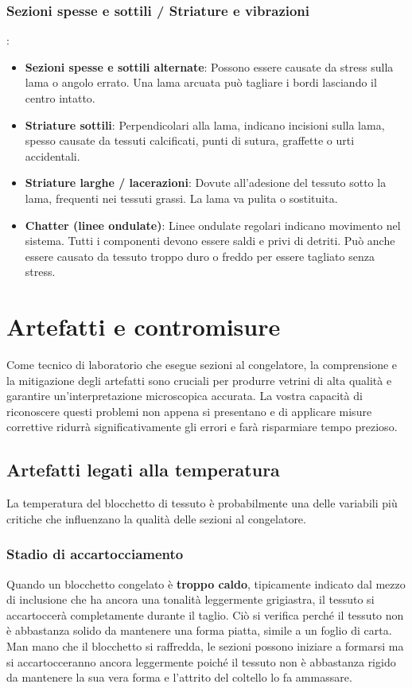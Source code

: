\subsubsection{Sezioni spesse e sottili / Striature e vibrazioni}:
\begin{itemize}
\item \textbf{Sezioni spesse e sottili alternate}: Possono essere causate da stress sulla lama o angolo errato. Una lama arcuata può tagliare i bordi lasciando il centro intatto.
\item \textbf{Striature sottili}: Perpendicolari alla lama, indicano incisioni sulla lama, spesso causate da tessuti calcificati, punti di sutura, graffette o urti accidentali.
\item \textbf{Striature larghe / lacerazioni}: Dovute all'adesione del tessuto sotto la lama, frequenti nei tessuti grassi. La lama va pulita o sostituita.
\item \textbf{Chatter (linee ondulate)}: Linee ondulate regolari indicano movimento nel sistema. Tutti i componenti devono essere saldi e privi di detriti. Può anche essere causato da tessuto troppo duro o freddo per essere tagliato senza stress.
\end{itemize}

\section{Artefatti e contromisure}
\label{sec:artefatti}
Come tecnico di laboratorio che esegue sezioni al congelatore, la comprensione e la mitigazione degli artefatti sono cruciali per produrre vetrini di alta qualità e garantire un'interpretazione microscopica accurata.  La vostra capacità di riconoscere questi problemi non appena si presentano e di applicare misure correttive ridurrà significativamente gli errori e farà risparmiare tempo prezioso. 

\subsection{Artefatti legati alla temperatura}
La temperatura del blocchetto di tessuto è probabilmente una delle variabili più critiche che influenzano la qualità delle sezioni al congelatore. 

\subsubsection{Stadio di accartocciamento}
Quando un blocchetto congelato è \textbf{troppo caldo}, tipicamente indicato dal mezzo di inclusione che ha ancora una tonalità leggermente grigiastra, il tessuto si accartoccerà completamente durante il taglio.  Ciò si verifica perché il tessuto non è abbastanza solido da mantenere una forma piatta, simile a un foglio di carta.  Man mano che il blocchetto si raffredda, le sezioni possono iniziare a formarsi ma si accartocceranno ancora leggermente poiché il tessuto non è abbastanza rigido da mantenere la sua vera forma e l'attrito del coltello lo fa ammassare. 

